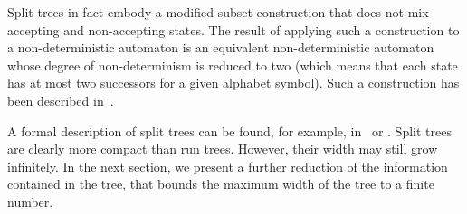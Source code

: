 Split trees in fact embody a modified subset construction that does not mix accepting and non-accepting states. The result of applying such a construction to a non-deterministic automaton is an equivalent non-deterministic automaton whose degree of non-determinism is reduced to two (which means that each state has at most two successors for a given alphabet symbol). Such a construction has been described in~\cite{UltesNitsche2007107}.

A formal description of split trees can be found, for example, in~\cite{vardi2007automata} or \cite{fogarty2013unifying}. Split trees are clearly more compact than run trees. However, their width may still grow infinitely. In the next section, we present a further reduction of the information contained in the tree, that bounds the maximum width of the tree to a finite number.










